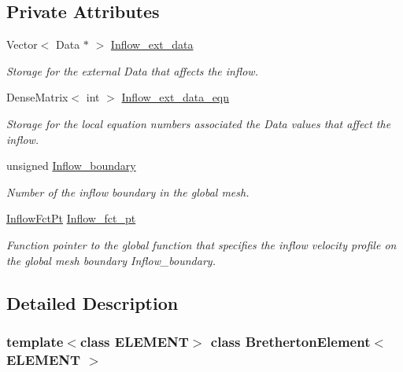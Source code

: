 \subsection*{Private Attributes}
\begin{DoxyCompactItemize}
\item 
Vector$<$ Data $\ast$ $>$ \hyperlink{classBrethertonElement_a84c7822cf2a97fe45e936429faa16788}{Inflow\+\_\+ext\+\_\+data}
\begin{DoxyCompactList}\small\item\em Storage for the external Data that affects the inflow. \end{DoxyCompactList}\item 
Dense\+Matrix$<$ int $>$ \hyperlink{classBrethertonElement_ad1ddf8c7a6fd590bf7156d13640303d1}{Inflow\+\_\+ext\+\_\+data\+\_\+eqn}
\begin{DoxyCompactList}\small\item\em Storage for the local equation numbers associated the Data values that affect the inflow. \end{DoxyCompactList}\item 
unsigned \hyperlink{classBrethertonElement_a2d3a3d4837d41865d5f62271c98715c5}{Inflow\+\_\+boundary}
\begin{DoxyCompactList}\small\item\em Number of the inflow boundary in the global mesh. \end{DoxyCompactList}\item 
\hyperlink{classBrethertonElement_a313d868ce6fbd8df07b0360db25133ce}{Inflow\+Fct\+Pt} \hyperlink{classBrethertonElement_a6ded0faba9d7fcfe96834c56af461977}{Inflow\+\_\+fct\+\_\+pt}
\begin{DoxyCompactList}\small\item\em Function pointer to the global function that specifies the inflow velocity profile on the global mesh boundary Inflow\+\_\+boundary. \end{DoxyCompactList}\end{DoxyCompactItemize}


\subsection{Detailed Description}
\subsubsection*{template$<$class E\+L\+E\+M\+E\+NT$>$\newline
class Bretherton\+Element$<$ E\+L\+E\+M\+E\+N\+T $>$}

